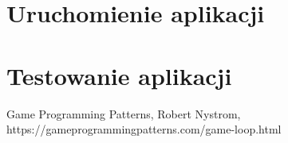 \documentclass[12pt,a4paper]{article} %
\begin{document}
\section{Uruchomienie aplikacji}

\section{Testowanie aplikacji}


\begin{thebibliography}{9}
Game Programming Patterns, Robert Nystrom, https://gameprogrammingpatterns.com/game-loop.html
\end{thebibliography}
\end{document}
